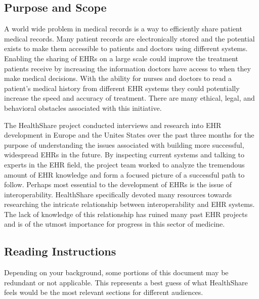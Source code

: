 \documentclass[14pt]{article}
\begin{document}



\subsection{Purpose and Scope}
A world wide problem in medical records is a way to efficiently share patient medical records. Many patient records are electronically stored and the potential exists to make them accessible to patients and doctors using different systems. Enabling the sharing of \glspl{EHR} on a large scale could improve the treatment patients receive by increasing the information doctors have access to when they make medical decisions. With the ability for nurses and doctors to read a patient's medical history from different \gls{EHR} systems they could potentially increase the speed and accuracy of treatment. There are many ethical, legal, and behavioral obstacles associated with this initiative.

The HealthShare project conducted interviews and research into \gls{EHR} development in Europe and the Unites States over the past three months for the purpose of understanding the issues associated with building more successful, widespread \glspl{EHR} in the future. By inspecting current systems and talking to experts in the \gls{EHR} field, the project team worked to analyze the tremendous amount of \gls{EHR} knowledge and form a focused picture of a successful path to follow. Perhaps most essential to the development of \glspl{EHR} is the issue of interoperability. HealthShare specifically devoted many resources towards researching the intricate relationship between interoperability and \gls{EHR} systems. The lack of knowledge of this relationship has ruined many past \gls{EHR} projects and is of the utmost importance for progress in this sector of medicine.


\subsection{Reading Instructions}
Depending on your background, some portions of this document may be redundant or not applicable. This represents a best guess of what HealthShare feels would be the most relevant sections for different audiences.
\end{document}
